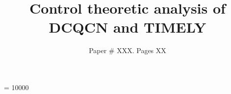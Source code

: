 \documentclass{sig-alternate-10pt-compact}
\begin{document}
\widowpenalty = 10000

\title{Control theoretic analysis of DCQCN and TIMELY}

\author{Paper \# XXX. Pages XX}

\maketitle












\end{document}
